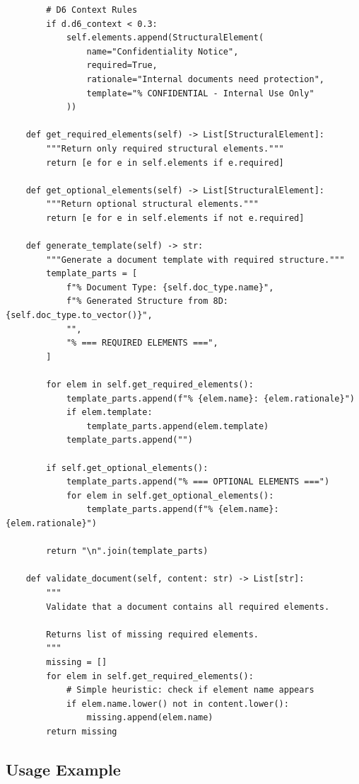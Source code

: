 \begin{verbatim}
        # D6 Context Rules
        if d.d6_context < 0.3:
            self.elements.append(StructuralElement(
                name="Confidentiality Notice",
                required=True,
                rationale="Internal documents need protection",
                template="% CONFIDENTIAL - Internal Use Only"
            ))

    def get_required_elements(self) -> List[StructuralElement]:
        """Return only required structural elements."""
        return [e for e in self.elements if e.required]

    def get_optional_elements(self) -> List[StructuralElement]:
        """Return optional structural elements."""
        return [e for e in self.elements if not e.required]

    def generate_template(self) -> str:
        """Generate a document template with required structure."""
        template_parts = [
            f"% Document Type: {self.doc_type.name}",
            f"% Generated Structure from 8D: {self.doc_type.to_vector()}",
            "",
            "% === REQUIRED ELEMENTS ===",
        ]

        for elem in self.get_required_elements():
            template_parts.append(f"% {elem.name}: {elem.rationale}")
            if elem.template:
                template_parts.append(elem.template)
            template_parts.append("")

        if self.get_optional_elements():
            template_parts.append("% === OPTIONAL ELEMENTS ===")
            for elem in self.get_optional_elements():
                template_parts.append(f"% {elem.name}: {elem.rationale}")

        return "\n".join(template_parts)

    def validate_document(self, content: str) -> List[str]:
        """
        Validate that a document contains all required elements.

        Returns list of missing required elements.
        """
        missing = []
        for elem in self.get_required_elements():
            # Simple heuristic: check if element name appears
            if elem.name.lower() not in content.lower():
                missing.append(elem.name)
        return missing
\end{verbatim}

\subsection{Usage Example}

